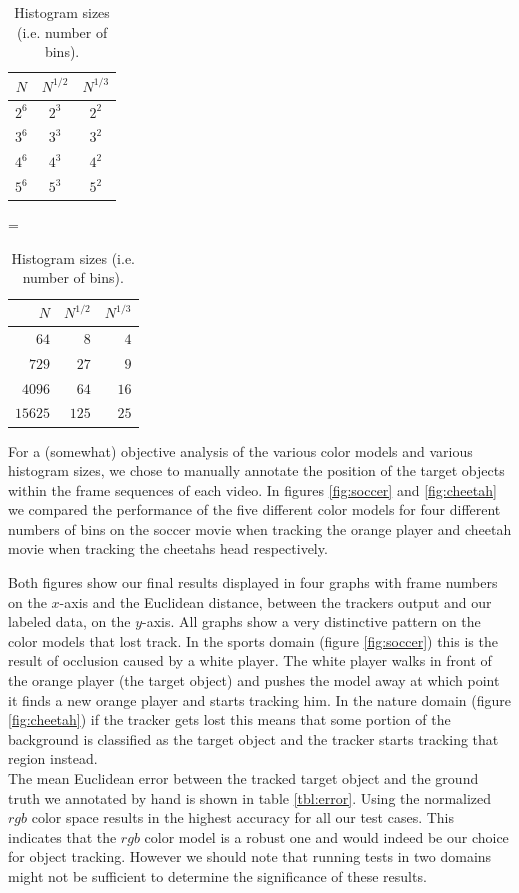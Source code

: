 \documentclass[11pt]{article}
\begin{document}
\begin{table}[!ht]
\centering
\begin{tabular}{c|c|c}
$N$   & $N^{1/2}$ & $N^{1/3}$\\\hline\hline
$2^6$ & $2^3$     & $2^2$\\\hline
$3^6$ & $3^3$     & $3^2$\\\hline
$4^6$ & $4^3$     & $4^2$\\\hline
$5^6$ & $5^3$     & $5^2$\\\hline
\end{tabular}
=
\begin{tabular}{r|r|r}
$N$     & $N^{1/2}$ & $N^{1/3}$\\\hline\hline
$64$    & $8$       & $4$\\\hline
$729$   & $27$      & $9$\\\hline
$4096$  & $64$      & $16$\\\hline
$15625$ & $125$     & $25$\\\hline
\end{tabular}
\caption{Histogram sizes (i.e. number of bins).}
\label{tbl:bins}
\end{table}

For a (somewhat) objective analysis of the various color models and various
histogram sizes, we chose to manually annotate the position of the target
objects within the frame sequences of each video. In figures \ref{fig:soccer}
and \ref{fig:cheetah} we compared the performance of
the five different color models for four different numbers of bins on the soccer
movie when tracking the orange player and cheetah movie when tracking the
cheetahs head respectively.

Both figures show our final results displayed in
four graphs with frame numbers on the $x$-axis and the Euclidean distance,
between the trackers output and our labeled data, on the $y$-axis. All graphs
show a very distinctive pattern on the color models that lost track. In the
sports domain (figure \ref{fig:soccer}) this is the result of occlusion caused by
a white player. The white player walks in front of the orange player (the
target object) and pushes the model away at which point it finds a new orange
player and starts tracking him. In the nature domain (figure \ref{fig:cheetah})
if the tracker gets lost this means that some portion of the background is
classified as the target object and the tracker starts tracking that region
instead.\\

The mean Euclidean error between the tracked target object and the ground truth
we annotated by hand is shown in table \ref{tbl:error}. Using the normalized
$rgb$ color space results in the highest accuracy for all our test cases.
This indicates that the $rgb$ color model is a robust one and would indeed be
our choice for object tracking. However we should note that running tests in two
domains might not be sufficient to determine the significance of these results.
\end{document}
